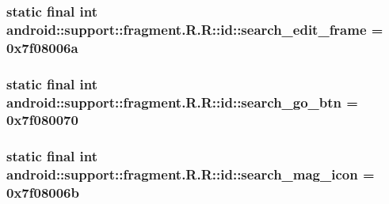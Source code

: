 \hypertarget{classandroid_1_1support_1_1fragment_1_1_r_1_1id_5b9cb14bbe223d452e71459047d4511e}{
\subsubsection[{search\_\-edit\_\-frame}]{\setlength{\rightskip}{0pt plus 5cm}static final int android::support::fragment.R.R::id::search\_\-edit\_\-frame = 0x7f08006a}}
\label{classandroid_1_1support_1_1fragment_1_1_r_1_1id_5b9cb14bbe223d452e71459047d4511e}


\hypertarget{classandroid_1_1support_1_1fragment_1_1_r_1_1id_a15595b1e90124a8096dff5b2d428bcb}{
\subsubsection[{search\_\-go\_\-btn}]{\setlength{\rightskip}{0pt plus 5cm}static final int android::support::fragment.R.R::id::search\_\-go\_\-btn = 0x7f080070}}
\label{classandroid_1_1support_1_1fragment_1_1_r_1_1id_a15595b1e90124a8096dff5b2d428bcb}


\hypertarget{classandroid_1_1support_1_1fragment_1_1_r_1_1id_9257f5ae50e0b4f5bc00b97548314069}{
\subsubsection[{search\_\-mag\_\-icon}]{\setlength{\rightskip}{0pt plus 5cm}static final int android::support::fragment.R.R::id::search\_\-mag\_\-icon = 0x7f08006b}}
\label{classandroid_1_1support_1_1fragment_1_1_r_1_1id_9257f5ae50e0b4f5bc00b97548314069}


